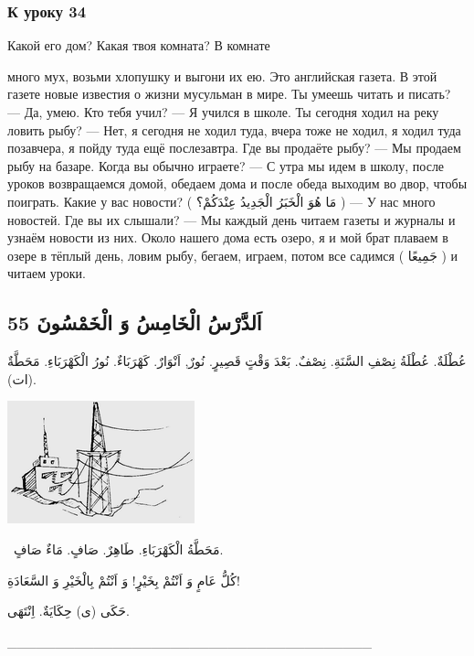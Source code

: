 \documentclass[a5paper]{article}
\begin{document}
\subsubsection{К уроку 34}
Какой его дом? Какая твоя комната? В комнате

много мух, возьми хлопушку и выгони их ею. Это английская газета. В этой газете новые известия о жизни мусульман в мире. Ты умеешь читать и писать? — Да, умею. Кто тебя учил? — Я учился в школе. Ты сегодня ходил на реку ловить рыбу? — Нет, я сегодня не ходил туда, вчера тоже не ходил, я ходил туда позавчера, я пойду туда ещё послезавтра. Где вы продаёте рыбу? — Мы продаем рыбу на базаре. Когда вы обычно играете? — С утра мы идем в школу, после уроков возвращаемся домой, обедаем дома и после обеда выходим во двор, чтобы поиграть. Какие у вас новости? ( مَا هُوَ الْخَبَرُ الْجَدِيدُ عِنْدَكُمْ؟ ) — У нас много новостей. Где вы их слышали? — Мы каждый день читаем газеты и журналы и узнаём новости из них. Около нашего дома есть озеро, я и мой брат плаваем в озере в тёплый день, ловим рыбу, бегаем, играем, потом все садимся ( جَمِيعًا ) и читаем уроки.

\subsection{اَلدَّرْسُ الْخَامِسُ وَ الْخَمْسُونَ 55}
عُطْلَةٌ. عُطْلَةُ نِصْفِ السَّنَةِ. نِصْفٌ. بَعْدَ وَقْتٍ قَصِيرٍ. نُورٌ, اَنْوَارٌ. كَهْرَبَاءٌ. نُورُ الْكَهْرَبَاءِ. مَحَطَّةٌ (ات). 

 \includegraphics[width=2.1354in,height=1.3957in]{images/MuhammadBagauddinprettified-img178.png} 

\ مَحَطَّةُ الْكَهْرَبَاءِ. طَاهِرٌ. صَافٍ. مَاءٌ صَافٍ. 

كُلُّ عَامٍ وَ اَنْتُمْ بِخَيْرٍ! وَ اَنْتُمْ بِالْخَيْرِ وَ السَّعَادَةِ! 

حَكَى (ى) حِكَايَةٌ. اِنْتَهَى.

\_\_\_\_\_\_\_\_\_\_\_\_\_\_\_\_\_\_\_\_\_\_\_\_\_\_\_\_\_\_\_\_\_\_\_\_\_\_
\end{document}
